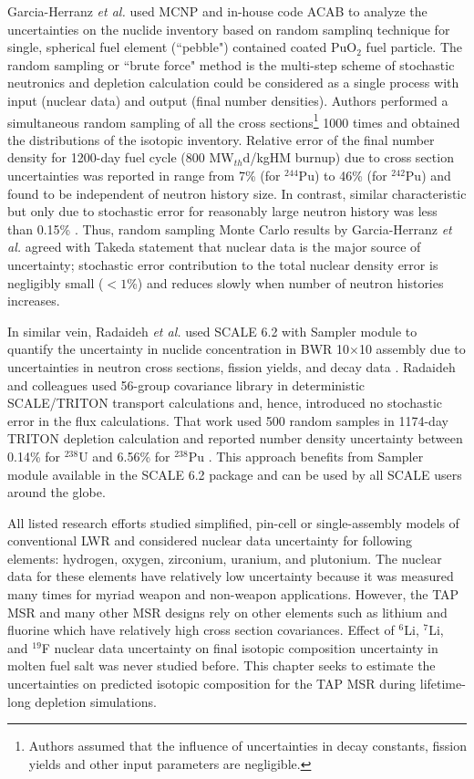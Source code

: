Garcia-Herranz \emph{et al.} used MCNP and in-house code ACAB to analyze the 
uncertainties on the nuclide inventory based on random samplinq technique for 
single, spherical fuel element (``pebble") contained coated PuO$_2$ fuel 
particle. The random sampling or ``brute force" method is the multi-step 
scheme of stochastic neutronics and depletion calculation could be considered 
as a single process with input (nuclear data) and output (final number 
densities). Authors performed a simultaneous random sampling of all the cross 
sections\footnote{Authors assumed that the influence of uncertainties in decay 
constants, fission yields and other input parameters are negligible.} 1000 
times and obtained the distributions of the isotopic inventory. Relative error 
of the final number density for 1200-day fuel cycle (800 MW$_{th}$d/kgHM 
burnup) due 
to cross section uncertainties was reported in range from 7\% (for $^{244}$Pu) 
to 46\% (for $^{242}$Pu) and found to be independent of neutron history size. 
In contrast, similar characteristic but only due to stochastic error for 
reasonably large neutron history was less than 0.15\% 
\cite{garcia-herranz_propagation_2008}. Thus, random sampling Monte Carlo 
results by Garcia-Herranz \emph{et al.} agreed with Takeda statement that 
nuclear data is the major source of uncertainty; stochastic error contribution 
to the total nuclear density error is negligibly small ($<1$\%) and reduces
slowly when number of neutron histories increases.

In similar vein, Radaideh \emph{et al.} used SCALE 6.2 with Sampler module
\cite{rearden_scale_2018} to quantify the uncertainty in nuclide concentration 
in \gls{BWR} 10$\times$10 assembly due to uncertainties in neutron cross 
sections, fission yields, and decay data \cite{radaideh_uncertainty_2018}.  
Radaideh and colleagues used 56-group covariance library in deterministic 
SCALE/TRITON transport calculations and, hence, introduced no stochastic error 
in the flux calculations. That work used 500 random samples in 1174-day TRITON 
depletion calculation and reported number density uncertainty between 0.14\% 
for $^{238}$U and 6.56\% for $^{238}$Pu \cite{radaideh_novel_2019-1}. This 
approach benefits from Sampler module available in the SCALE 6.2 package and 
can be used by all SCALE users around the globe.

All listed research efforts studied simplified, pin-cell or single-assembly 
models of conventional \gls{LWR} and considered nuclear data uncertainty for 
following elements: hydrogen, oxygen, zirconium, uranium, and plutonium. The 
nuclear data for these elements have relatively low uncertainty because it was 
measured many times for myriad weapon and non-weapon applications. However, 
the \gls{TAP} \gls{MSR} and many other \gls{MSR} designs rely on other 
elements such as lithium and fluorine which have relatively high cross section 
covariances. Effect of $^6$Li, $^7$Li, and $^{19}$F nuclear data uncertainty 
on final isotopic composition uncertainty in molten fuel salt was never 
studied before. This chapter seeks to estimate the uncertainties on predicted 
isotopic composition for the \gls{TAP} \gls{MSR} during lifetime-long 
depletion simulations.

